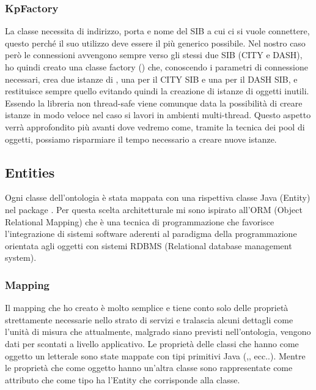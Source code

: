 \subsubsection{KpFactory}

La classe  necessita di indirizzo, porta e nome del SIB a cui ci si vuole connettere, questo perché il suo utilizzo deve essere il più generico possibile. Nel nostro caso però le connessioni avvengono sempre verso gli stessi due SIB (CITY e DASH), ho quindi creato una classe factory () che, conoscendo i parametri di connessione necessari, crea due istanze di , una per il CITY SIB e una per il DASH SIB, e restituisce sempre quello evitando quindi la creazione di istanze di oggetti inutili. Essendo la libreria  non thread-safe viene comunque data la possibilità di creare istanze in modo veloce nel caso si lavori in ambienti multi-thread. Questo aspetto verrà approfondito più avanti dove vedremo come, tramite la tecnica dei pool di oggetti, possiamo risparmiare il tempo necessario a creare nuove istanze.


\subsection{Entities}

Ogni classe dell'ontologia è stata mappata con una rispettiva classe Java (Entity) nel package  . Per questa scelta architetturale mi sono ispirato all'ORM (Object Relational Mapping) che è una tecnica di programmazione che favorisce l'integrazione di sistemi software aderenti al paradigma della programmazione orientata agli oggetti con sistemi RDBMS (Relational database management system). %

\subsubsection{Mapping} 

Il mapping che ho creato è molto semplice e tiene conto solo delle proprietà strettamente necessarie nello strato di servizi e tralascia alcuni dettagli come l'unità di misura che attualmente, malgrado siano previsti nell'ontologia, vengono dati per scontati a livello applicativo.
Le proprietà delle classi che hanno come oggetto un letterale sono state mappate con tipi primitivi Java (,, ecc..). Mentre le proprietà che come oggetto hanno un'altra classe sono rappresentate come attributo che come tipo ha l'Entity
che corrisponde alla classe. 


